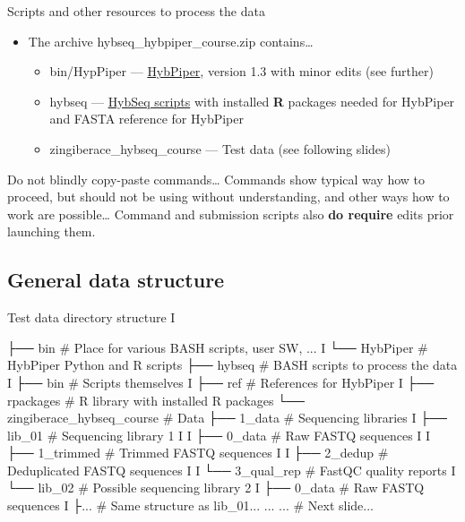 \documentclass[compress, ucs, xelatex, 11pt, xcolor=x11names, aspectratio=169,
	hyperref={
		bookmarks=true,
		unicode=true,
		colorlinks=true,
		pdftitle={HybSeq course},
		plainpages=false,
		pdfauthor={Vojtech Zeisek},
		pdfsubject={Practical processing of HybSeq target enrichment sequencing data on computing grids like MetaCentrum},
		pdfcreator={XeLaTeX},
		pdfkeywords={BASH, command line, GNU, HybSeq, Linux, MetaCentrum, sequencing shell, target enrichment},
		linkcolor=Turquoise4, %
		anchorcolor=DodgerBlue4, %
		citecolor=DodgerBlue4, %
		filecolor=DodgerBlue4, %
		menucolor=Tan4, %
		urlcolor=DarkOliveGreen4, %
		pdftex},
	url={hyphens, lowtilde} %
	]{beamer}
\renewcommand{\texttt}[1]{\colorbox{Cornsilk2}{{\ttfamily #1}}}
\renewcommand{\alert}[1]{\textcolor{OrangeRed3}{#1}}
\begin{document}
\begin{frame}{Scripts and other resources to process the data}
	\begin{itemize}
		\item The archive \texttt{hybseq\_hybpiper\_course.zip} contains\ldots
		\begin{itemize}
			\item \texttt{bin/HypPiper} --- \href{https://github.com/mossmatters/HybPiper/}{HybPiper}, version 1.3 with minor edits (see further)
			\item \texttt{hybseq} --- \href{https://github.com/V-Z/hybseq-scripts}{HybSeq scripts} with installed \textbf{R} packages needed for HybPiper and FASTA reference for HybPiper
			\item \texttt{zingiberace\_hybseq\_course} --- Test data (see following slides)
		\end{itemize}
	\end{itemize}
	\begin{alertblock}{Do not blindly copy-paste commands\ldots}
		\alert{Commands show typical way how to proceed, but should not be using without understanding, and other ways how to work are possible\ldots}{ }Command and submission scripts also \textbf{do require} edits prior launching them.
	\end{alertblock}
\end{frame}

\subsection{General data structure}

\begin{frame}[fragile]{Test data directory structure I}
	\label{datastructure}
	\begin{bashcode}
    ├── bin # Place for various BASH scripts, user SW, ...
    I   └── HybPiper # HybPiper Python and R scripts
    ├── hybseq # BASH scripts to process the data
    I   ├── bin # Scripts themselves
    I   ├── ref # References for HybPiper
    I   ├── rpackages # R library with installed R packages
    └── zingiberace_hybseq_course # Data
        ├── 1_data # Sequencing libraries
        I   ├── lib_01 # Sequencing library 1
        I   I   ├── 0_data # Raw FASTQ sequences
        I   I   ├── 1_trimmed # Trimmed FASTQ sequences
        I   I   ├── 2_dedup # Deduplicated FASTQ sequences
        I   I   └── 3_qual_rep # FastQC quality reports
        I   └── lib_02 # Possible sequencing library 2
        I       ├── 0_data # Raw FASTQ sequences
        I       ├... # Same structure as lib_01...
        ...     ... # Next slide...
	\end{bashcode}
\end{frame}
\end{document}
